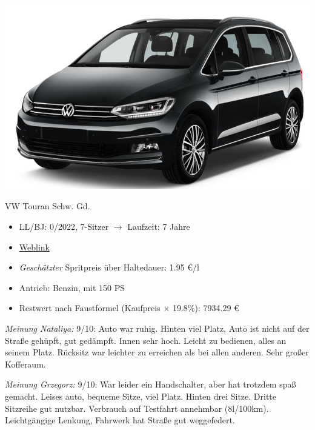 \documentclass[landscape, DIV=99, 14pt]{scrartcl}
\begin{document}
\pagebreak
\begin{center}
\includegraphics[width=0.9\columnwidth]{cars/vw-touran.png}

VW Touran Schw. Gd.
\end{center}

\begin{itemize}
    \item LL/BJ: 0/2022, 7-Sitzer $\rightarrow$ Laufzeit: 7 Jahre
    \item \href{https://www.volkswagen.de/de/konfigurator.html/__app/touran/touran/comfortline.app?buildabilityStatus-app=buildable&category-app=private&carlineId-app=31000&salesGroupId-app=32600&trimName-app=Comfortline&modelId-app=5T13PZ%24GYORYOR&modelVersion-app=3&modelYear-app=2022&exteriorId-app=F14+5K5K&interiorId-app=F56+++++VE&options-app=MSTD7B2-GPG4PG4-MESSU9C-GPJ9PJ9-GPF6PF6-GPKJPKJ-GPLLPLL-MHKAKH7-GWLLWLL-GWL2WL2-GPM3PM3-GRBDRBD-MTRW3CX-MKSUKA1-MSAB4X4-GP19P19-GWQ1WQ1-GWWCWWC}{Weblink}
    \item \emph{Gesch\"atzter} Spritpreis \"uber Haltedauer: 1.95 \euro{}/l
    \item Antrieb: Benzin, mit 150 PS
    \item Restwert nach Faustformel (Kaufpreis $\times$ 19.8\%): 7934.29 \euro{}
\end{itemize}

\begin{small}
\emph{Meinung Nataliya:} 9/10: Auto war ruhig. Hinten viel Platz, Auto ist nicht auf der Straße gehüpft,
                    gut gedämpft. Innen sehr hoch. Leicht zu bedienen, alles an seinem Platz. Rücksitz
                    war leichter zu erreichen als bei allen anderen. Sehr großer Kofferaum.
        
\emph{Meinung Grzegorz:} 9/10: War leider ein Handschalter, aber hat trotzdem spaß gemacht. 
                   Leises auto, bequeme Sitze, viel Platz. Hinten drei Sitze. Dritte Sitzreihe gut nutzbar.
                   Verbrauch auf Testfahrt annehmbar (8l/100km). Leichtgängige Lenkung, Fahrwerk hat Straße 
                   gut weggefedert.
\end{small}
\end{document}

